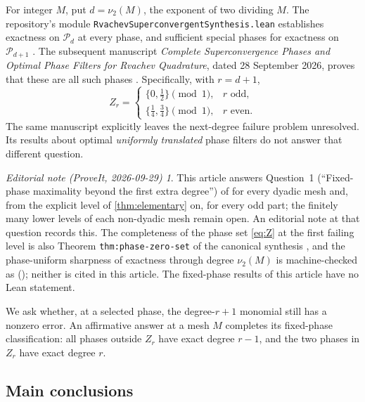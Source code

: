 \documentclass[11pt,a4paper]{article}
\numberwithin{equation}{section}
\theoremstyle{plain}
\theoremstyle{definition}
\theoremstyle{remark}
\newtheorem*{ednote}{Editorial note (ProveIt, 2026-09-29)}
\newcommand{\vTwo}{\nu_2}
\newcommand{\Poly}{\mathcal P}
\newcommand{\code}[1]{\texttt{\small #1}}
\begin{document}
For integer $M$, put $d=\vTwo(M)$, the exponent of two dividing $M$.
The repository's module \code{RvachevSuperconvergentSynthesis.lean}
establishes exactness on $\Poly_d$ at every phase, and sufficient special
phases for exactness on $\Poly_{d+1}$ \cite{repo-lean}. The subsequent
manuscript \emph{Complete Superconvergence Phases and Optimal Phase Filters
for Rvachev Quadrature}, dated 28 September 2026, proves that these are all
such phases \cite{repo-phase}. Specifically, with $r=d+1$,
\begin{equation}\label{eq:Z}
 Z_r=\begin{cases}
 \{0,\tfrac12\}\pmod1,&r\text{ odd},\\[2pt]
 \{\tfrac14,\tfrac34\}\pmod1,&r\text{ even}.
 \end{cases}
\end{equation}
The same manuscript explicitly leaves the next-degree failure problem
unresolved. Its results about optimal \emph{uniformly translated} phase
filters do not answer that different question.

\begin{ednote}
This article answers Question~1 (``Fixed-phase maximality beyond the first
extra degree'') of \cite{repo-phase} for every dyadic mesh and, from the
explicit level of \cref{thm:elementary} on, for every odd part; the finitely
many lower levels of each non-dyadic mesh remain open. An editorial note at
that question records this. The completeness of the phase set \eqref{eq:Z}
at the first failing level is also Theorem \texttt{thm:phase-zero-set} of
the canonical synthesis
,
and the phase-uniform sharpness of exactness through degree $\vTwo(M)$ is
machine-checked as
();
neither is cited in this article. The fixed-phase results of this article
have no Lean statement.
\end{ednote}

We ask whether, at a selected phase, the degree-$r+1$ monomial still has a
nonzero error. An affirmative answer at a mesh $M$ completes its fixed-phase
classification: all phases outside $Z_r$ have exact degree $r-1$, and the
two phases in $Z_r$ have exact degree $r$.

\subsection{Main conclusions}
\end{document}
